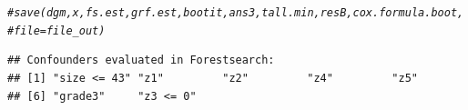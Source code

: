 \documentclass[smallextended]{svjour3}
\makeatletter
\newcommand{\hlcom}[1]{\textcolor[rgb]{0.678,0.584,0.686}{\textit{#1}}}%
\newenvironment{kframe}{%
 \def\at@end@of@kframe{}%
 \ifinner\ifhmode%
  \def\at@end@of@kframe{\end{minipage}}%
  \begin{minipage}{\columnwidth}%
 \fi\fi%
 \def\FrameCommand##1{\hskip\@totalleftmargin \hskip-\fboxsep
 \colorbox{shadecolor}{##1}\hskip-\fboxsep
     \hskip-\linewidth \hskip-\@totalleftmargin \hskip\columnwidth}%
 \MakeFramed {\advance\hsize-\width
   \@totalleftmargin\z@ \linewidth\hsize
   \@setminipage}}%
 {\par\unskip\endMakeFramed%
 \at@end@of@kframe}
\newenvironment{knitrout}{}{} %
\makeatother
\begin{document}
\begin{knitrout}
\begin{kframe}
\begin{alltt}
\hlcom{# save(dgm, x, fs.est, grf.est, bootit, ans3, tall.min, resB, cox.formula.boot,}
\hlcom{# file=file_out)}
\end{alltt}
\end{kframe}
\end{knitrout}



\begin{knitrout}
\color{fgcolor}\begin{kframe}
\begin{verbatim}
## Confounders evaluated in Forestsearch:
## [1] "size <= 43" "z1"         "z2"         "z4"         "z5"        
## [6] "grade3"     "z3 <= 0"
\end{verbatim}
\end{kframe}
\end{knitrout}
\end{document}
